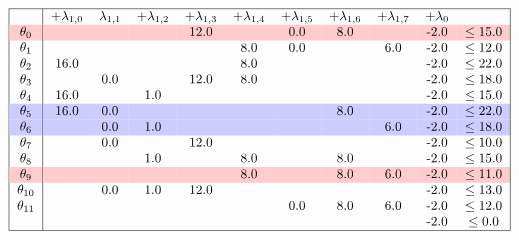 \documentclass{article}
\begin{document}
    \[
        \begin{tabular}{ |c|c c c c c c c c c c| }
            \hline
            & +$\lambda_{1,0}$ & $\lambda_{1,1}$ & +$\lambda_{1,2}$ & +$\lambda_{1,3}$ & +$\lambda_{1,4}$ & +$\lambda_{1,5}$ & +$\lambda_{1,6}$ & +$\lambda_{1,7}$  & +$\lambda_{0}$ &  \\
            \rowcolor{red!20}
            $\theta_{0}$ && & & 12.0 && 0.0 &8.0 && -2.0& $\leq 15.0$ \\
            $\theta_{1}$ && & & & 8.0 &0.0 && 6.0 &-2.0& $\leq 12.0$ \\
            $\theta_{2}$ &16.0 && & & 8.0 && & & -2.0& $\leq 22.0$ \\
            $\theta_{3}$ && 0.0 && 12.0 &8.0 && & & -2.0& $\leq 18.0$ \\
            $\theta_{4}$ &16.0 && 1.0 && & & & & -2.0& $\leq 15.0$ \\
            \rowcolor{blue!20}
            $\theta_{5}$ &16.0 &0.0 && & & & 8.0 && -2.0& $\leq 22.0$ \\
            \rowcolor{blue!20}
            $\theta_{6}$ && 0.0 &1.0 && & & & 6.0 &-2.0& $\leq 18.0$ \\
            $\theta_{7}$ && 0.0 && 12.0 && & & & -2.0& $\leq 10.0$ \\
            $\theta_{8}$ && & 1.0 && 8.0 && 8.0 && -2.0& $\leq 15.0$ \\
            \rowcolor{red!20}
            $\theta_{9}$ && & & & 8.0 && 8.0 &6.0 &-2.0& $\leq 11.0$ \\
            $\theta_{10}$ && 0.0 &1.0 &12.0 && & & & -2.0& $\leq 13.0$ \\
            $\theta_{11}$ && & & & & 0.0 &8.0 &6.0 &-2.0& $\leq 12.0$ \\
            && & & & &  && & -2.0 & $\leq 0.0$ \\
            \hline
        \end{tabular}
    \]
\end{document}
